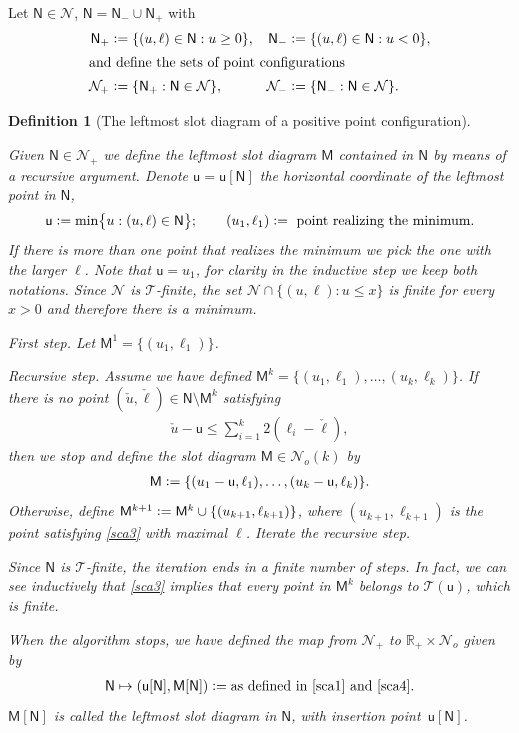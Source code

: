 \documentclass[12pt]{article}
\numberwithin{equation}{section}
\newtheorem{definition}[theorem]{Definition}
\newcommand{\R}{\mathbb R}
\newcommand{\cN}{\mathcal N}
\newcommand{\sM}{\mathsf{M}}
\newcommand{\sN}{\mathsf{N}}
\newcommand{\su}{{\mathsf{u}}}
\newcommand{\ckl}{{\check \ell}}
\newcommand{\cku}{{\check u}}
\newcommand{\tsum}{\textstyle{\sum}}
\begin{document}
Let $\sN\in\cN$, $\sN=\sN_-\cup\sN_+$ with
\begin{align}
 \sN_+ &\vcentcolon =\{(u, \ell)\in\sN: u\ge0\}, & \sN_- &\vcentcolon =\{(u, \ell)\in\sN: u<0\}, \label{sn+-}\\
 \intertext{and define the sets of point configurations}
  \cN_+&\vcentcolon = \{\sN_+:\sN\in\cN\},&\cN_-&\vcentcolon = \{\sN_-:\sN\in\cN\}.\label{cn+-}
\end{align}

\begin{definition}
  [The leftmost slot diagram of a positive point configuration]  \label{18}
 
\rm Given $\sN\in\cN_+$ we define the leftmost slot diagram $\sM$ contained in $\sN$ by means of a recursive argument.
Denote $\su=\su[\sN]$ the horizontal coordinate of the leftmost point in $\sN$,
\begin{align}
 \label{sca1}
 \su\vcentcolon = \min\bigl\{u:(u, \ell)\in\sN\bigr\};\qquad (u_1, \ell_1)\vcentcolon =\text{ point realizing the minimum}.
\end{align}
If there is more than one point that realizes the minimum we pick the one with the larger $\ell$. Note that $\su=u_1$, for clarity in the inductive step we keep both notations.
Since $\cN$ is $\mathcal T$-finite, the set $\cN\cap \{(u,\ell): u\leq x \}$ is finite for every $x>0$ and therefore there is a minimum.



First step. Let $\sM^1= \{(u_1,\ell_1)\}$. 


Recursive step.  Assume we have defined $\sM^k=\{(u_1, \ell_1), \dots, (u_k, \ell_k)\}$.
If there is no point $(\cku, \ckl)\in\sN\setminus \sM^k$ satisfying 
\begin{align}
\cku-\su\le \tsum_{i=1}^k2(\ell_i-\ckl),
 \label{sca3}
\end{align}
then we stop and define the slot diagram $\sM\in\cN_o(k)$ by
\begin{align}
 \label{sca4}
 \sM\vcentcolon =\{(u_1-\su, \ell_1), \dots, (u_k-\su, \ell_k)\}.
\end{align}
Otherwise, define $\sM^{k+1}\vcentcolon = \sM^k\cup\{(u_{k+1}, \ell_{k+1})\}$, where $(u_{k+1}, \ell_{k+1})$ is the point satisfying \eqref{sca3} with maximal $\ell$. Iterate the recursive step.

Since $\sN$ is $\mathcal T$-finite, the iteration ends in a finite number of steps.
In fact, we can see inductively that \eqref{sca3} implies that every point in $\sM^k$ belongs to $\mathcal T(\su)$, which is finite.


When the algorithm stops, we have defined the map from $\cN_+$ to $\R_+\times\cN_o$ given by
\begin{align}
 \sN\mapsto (\su[\sN], \sM[\sN])\vcentcolon = \text{as defined in \eqref{sca1} and \eqref{sca4}}.
 \label{sc12}
\end{align}
$\sM[\sN]$ is called the leftmost slot diagram in $\sN$, with insertion point~$\su[\sN]$.  
\end{definition}
\end{document}
